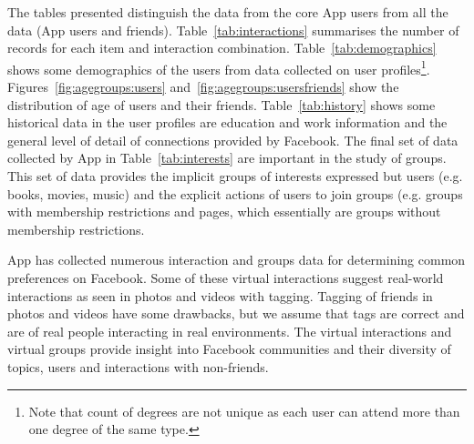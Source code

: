 The tables presented distinguish the data from the core App users from
all the data (App users and friends). Table~\ref{tab:interactions}
summarises the number of records for each item and interaction
combination. Table~\ref{tab:demographics} shows some demographics of
the users from data collected on user profiles\footnote{Note that
count of degrees are not unique as each user can attend more than one
degree of the same type.}. Figures~\ref{fig:agegroups:users}
and~\ref{fig:agegroups:usersfriends} show the distribution of age of
users and their friends. Table~\ref{tab:history} shows some historical
data in the user profiles are education and work information and the
general level of detail of connections provided by Facebook. The final
set of data collected by App in Table~\ref{tab:interests} are
important in the study of groups. This set of data provides the
implicit groups of interests expressed but users (e.g. books, movies,
music) and the explicit actions of users to join groups (e.g. groups
with membership restrictions and pages, which essentially are groups
without membership restrictions.

App has collected numerous interaction and groups data for determining common preferences on Facebook. Some of these virtual interactions suggest real-world interactions as seen in photos and videos with tagging. Tagging of friends in photos and videos have some drawbacks, but we assume that tags are correct and are of real people interacting in real environments. The virtual interactions and virtual groups provide insight into Facebook communities and their diversity of topics, users and interactions with non-friends.


